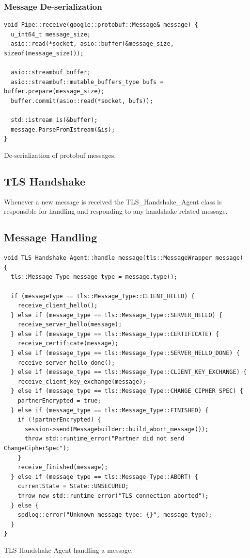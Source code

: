 \documentclass[12pt, letterpaper]{article}
\newenvironment{code}{\captionsetup{type=listing}}{}
\begin{document}
\subsubsection{Message De-serialization}
\begin{code}
	\begin{verbatim}
void Pipe::receive(google::protobuf::Message& message) {
  u_int64_t message_size;
  asio::read(*socket, asio::buffer(&message_size, sizeof(message_size)));
	
  asio::streambuf buffer;
  asio::streambuf::mutable_buffers_type bufs = buffer.prepare(message_size);
  buffer.commit(asio::read(*socket, bufs));
	
  std::istream is(&buffer);
  message.ParseFromIstream(&is);
}
	\end{verbatim}
	\caption{De-serialization of protobuf messages.}
	\label{pipeReceive}
\end{code}

\pagebreak

\subsection{TLS Handshake}
Whenever a new message is received the TLS\_Handshake\_Agent class is responsible for handling and responding to any handshake related message.

\subsection{Message Handling}

\begin{code}
	\begin{verbatim}
void TLS_Handshake_Agent::handle_message(tls::MessageWrapper message) {    
  tls::Message_Type message_type = message.type();

  if (messageType == tls::Message_Type::CLIENT_HELLO) {
    receive_client_hello();
  } else if (message_type == tls::Message_Type::SERVER_HELLO) {
    receive_server_hello(message);
  } else if (message_type == tls::Message_Type::CERTIFICATE) {
    receive_certificate(message);
  } else if (message_type == tls::Message_Type::SERVER_HELLO_DONE) {
    receive_server_hello_done();
  } else if (message_type == tls::Message_Type::CLIENT_KEY_EXCHANGE) {
    receive_client_key_exchange(message);
  } else if (message_type == tls::Message_Type::CHANGE_CIPHER_SPEC) {
    partnerEncrypted = true;
  } else if (message_type == tls::Message_Type::FINISHED) {
    if (!partnerEncrypted) {
      session->send(Messagebuilder::build_abort_message());
      throw std::runtime_error("Partner did not send ChangeCipherSpec");
    }
    receive_finished(message);
  } else if (message_type == tls::Message_Type::ABORT) {
    currentState = State::UNSECURED;
    throw new std::runtime_error("TLS connection aborted");
  } else {
    spdlog::error("Unknown message type: {}", message_type);
  }
}
	\end{verbatim}
	\caption{TLS Handshake Agent handling a message.}
	\label{messageHandling}
\end{code}
\end{document}
